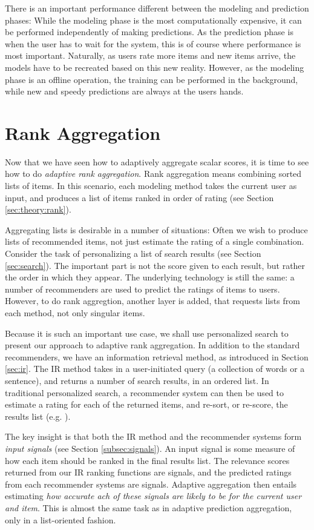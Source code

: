 There is an important performance different between the modeling and prediction phases:
While the modeling phase is the most computationally expensive,
it can be performed independently of making predictions.
As the prediction phase is when the user has to wait for the system,
this is of course where performance is most important.
Naturally, as users rate more items and new items arrive,
the models have to be recreated based on this new reality.
However, as the modeling phase is an offline operation,
the training can be performed in the background, while new
and speedy predictions are always at the users hands.


\section{Rank Aggregation}
\label{sec:methods:rank}

Now that we have seen how to adaptively aggregate scalar scores, it is time to see how
to do \emph{adaptive rank aggregation}. Rank aggregation means combining sorted lists of items.
In this scenario, each modeling method takes the current user as input, and produces a
list of items ranked in order of rating
(see Section \ref{sec:theory:rank}).

Aggregating lists is desirable in a number of situations:
Often we wish to produce lists of recommended items, not just estimate the rating of a single combination.
Consider the task of personalizing a list of search results
(see Section \ref{sec:search}). The important part is not the score
given to each result, but rather the order in which they appear.
The underlying technology is still the same: a number of recommenders are used to predict the ratings
of items to users. However, to do rank aggregtion, another layer is added, that requests lists from each method,
not only singular items.

Because it is such an important use case, we shall use personalized search to present our approach to adaptive rank aggregation.
In addition to the standard recommenders, we have an information retrieval method,
as introduced in Section \ref{sec:ir}.
The IR method takes in a user-initiated query (a collection of words or a sentence), and returns a number of 
search results, in an ordered list.
In traditional personalized search, a recommender system can then be used to estimate a rating for each of the returned items,
and re-sort, or re-score, the results list (e.g. \citet[p3]{Xu2008}).

The key insight is that both the IR method and the recommender systems form \emph{input signals}
(see Section \ref{subsec:signals}).
An input signal is some measure of how each item should be ranked in the final results list.
The relevance scores returned from our IR ranking functions are signals,
and the predicted ratings from each recommender systems are signals.
Adaptive aggregation then entails estimating \emph{how accurate ach of these signals are likely to be for the current user and item}.
This is almost the same task as in adaptive prediction aggregation, only in a list-oriented fashion.

